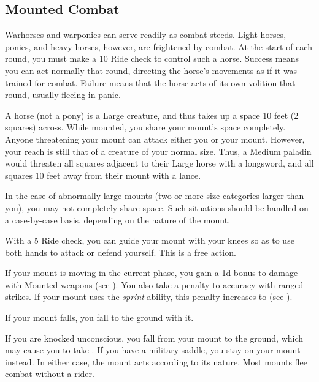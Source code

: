     \subsection{Mounted Combat}\label{Mounted Combat}
         Warhorses and warponies can serve readily as combat steeds. Light horses, ponies, and heavy horses, however, are frightened by combat.
        At the start of each round, you must make a  10 Ride check to control such a horse.
        Success means you can act normally that round, directing the horse's movements as if it was trained for combat.
        Failure means that the horse acts of its own volition that round, usually fleeing in panic.

         A horse (not a pony) is a Large creature, and thus takes up a space 10 feet (2 squares) across. While mounted, you share your mount's space completely. Anyone threatening your mount can attack either you or your mount. However, your reach is still that of a creature of your normal size. Thus, a Medium paladin would threaten all squares adjacent to their Large horse with a longsword, and all squares 10 feet away from their mount with a lance.

        In the case of abnormally large mounts (two or more size categories larger than you), you may not completely share space. Such situations should be handled on a case-by-case basis, depending on the nature of the mount.

         With a  5 Ride check, you can guide your mount with your knees so as to use both hands to attack or defend yourself. This is a free action.

        If your mount is moving in the current phase, you gain a \plus1d bonus to damage with Mounted weapons (see ).
        You also take a  penalty to accuracy with ranged strikes.
        If your mount uses the \textit{sprint} ability, this penalty increases to  (see ).

         If your mount falls, you fall to the ground with it.

         If you are knocked unconscious, you fall from your mount to the ground, which may cause you to take .
        If you have a military saddle, you stay on your mount instead.
        In either case, the mount acts according to its nature.
        Most mounts flee combat without a rider.

